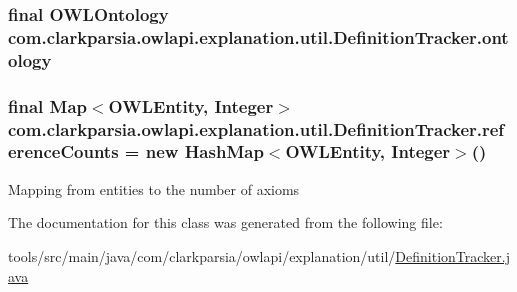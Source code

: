 \hypertarget{classcom_1_1clarkparsia_1_1owlapi_1_1explanation_1_1util_1_1_definition_tracker_a8ef0afa6dbb2c5bdb3ed4dda7bda35e5}{
\subsubsection[{ontology}]{\setlength{\rightskip}{0pt plus 5cm}final {\bf O\-W\-L\-Ontology} com.\-clarkparsia.\-owlapi.\-explanation.\-util.\-Definition\-Tracker.\-ontology\hspace{0.3cm}{\ttfamily [private]}}}\label{classcom_1_1clarkparsia_1_1owlapi_1_1explanation_1_1util_1_1_definition_tracker_a8ef0afa6dbb2c5bdb3ed4dda7bda35e5}
\hypertarget{classcom_1_1clarkparsia_1_1owlapi_1_1explanation_1_1util_1_1_definition_tracker_a04d57edaa34e32325cab310bf6cf5190}{
\subsubsection[{reference\-Counts}]{\setlength{\rightskip}{0pt plus 5cm}final Map$<${\bf O\-W\-L\-Entity}, Integer$>$ com.\-clarkparsia.\-owlapi.\-explanation.\-util.\-Definition\-Tracker.\-reference\-Counts = new Hash\-Map$<${\bf O\-W\-L\-Entity}, Integer$>$()\hspace{0.3cm}{\ttfamily [private]}}}\label{classcom_1_1clarkparsia_1_1owlapi_1_1explanation_1_1util_1_1_definition_tracker_a04d57edaa34e32325cab310bf6cf5190}
Mapping from entities to the number of axioms 

The documentation for this class was generated from the following file\-:\begin{DoxyCompactItemize}
\item 
tools/src/main/java/com/clarkparsia/owlapi/explanation/util/\hyperlink{_definition_tracker_8java}{Definition\-Tracker.\-java}\end{DoxyCompactItemize}
